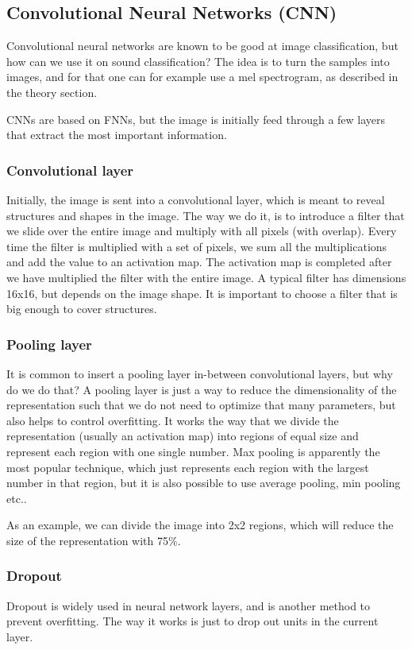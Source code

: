 \subsection{Convolutional Neural Networks (CNN)}
Convolutional neural networks are known to be good at image classification, but how can we use it on sound classification? The idea is to turn the samples into images, and for that one can for example use a mel spectrogram, as described in the theory section. 

CNNs are based on FNNs, but the image is initially feed through a few layers that extract the most important information. 

\subsubsection*{Convolutional layer}
Initially, the image is sent into a convolutional layer, which is meant to reveal structures and shapes in the image. The way we do it, is to introduce a filter that we slide over the entire image and multiply with all pixels (with overlap). Every time the filter is multiplied with a set of pixels, we sum all the multiplications and add the value to an activation map. The activation map is completed after we have multiplied the filter with the entire image. A typical filter has dimensions 16x16, but depends on the image shape. It is important to choose a filter that is big enough to cover structures. 

\subsubsection*{Pooling layer}
It is common to insert a pooling layer in-between convolutional layers, but why do we do that? A pooling layer is just a way to reduce the dimensionality of the representation such that we do not need to optimize that many parameters, but also helps to control overfitting. It works the way that we divide the representation (usually an activation map) into regions of equal size and represent each region with one single number. Max pooling is apparently the most popular technique, which just represents each region with the largest number in that region, but it is also possible to use average pooling, min pooling etc.. \cite{pooling}

As an example, we can divide the image into 2x2 regions, which will reduce the size of the representation with 75\%. 

\subsubsection*{Dropout}
Dropout is widely used in neural network layers, and is another method to prevent overfitting. The way it works is just to drop out units in the current layer.

